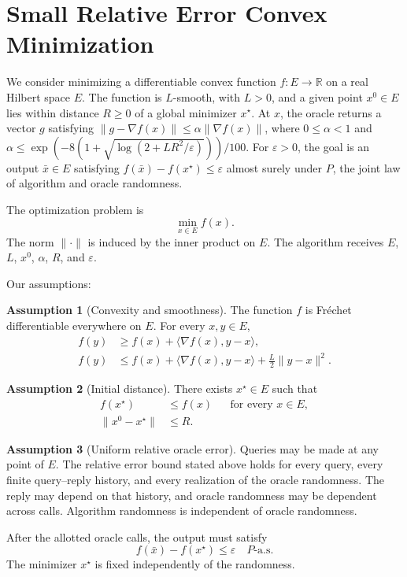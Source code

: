 \documentclass[10pt]{article}
\theoremstyle{definition}
\newtheorem{assumption}{Assumption}
\begin{document}
\section*{Small Relative Error Convex Minimization}
We consider minimizing a differentiable convex function $f:E\to\mathbb{R}$ on a real Hilbert space $E$. The function is $L$-smooth, with $L>0$, and a given point $x^0\in E$ lies within distance $R\geq0$ of a global minimizer $x^\star$. At $x$, the oracle returns a vector $g$ satisfying $\|g-\nabla f(x)\|\leq\alpha\|\nabla f(x)\|$, where $0\leq\alpha<1$ and $\alpha\leq\exp(-8(1+\sqrt{\log(2+LR^2/\varepsilon)}))/100$. For $\varepsilon>0$, the goal is an output $\bar{x}\in E$ satisfying $f(\bar{x})-f(x^\star)\leq\varepsilon$ almost surely under $P$, the joint law of algorithm and oracle randomness.

The optimization problem is
\[
\min_{x\in E} f(x).
\]
The norm $\|\cdot\|$ is induced by the inner product on $E$. The algorithm receives $E$, $L$, $x^0$, $\alpha$, $R$, and $\varepsilon$.

Our assumptions:
\begin{assumption}[Convexity and smoothness]
The function $f$ is Fr\'echet differentiable everywhere on $E$. For every $x,y\in E$,
\[
\begin{aligned}
f(y)&\geq f(x)+\langle\nabla f(x),y-x\rangle,\\
f(y)&\leq f(x)+\langle\nabla f(x),y-x\rangle
       +\frac{L}{2}\|y-x\|^2.
\end{aligned}
\]
\end{assumption}

\begin{assumption}[Initial distance]
There exists $x^\star\in E$ such that
\[
\begin{aligned}
f(x^\star)&\leq f(x) &&\text{for every }x\in E,\\
\|x^0-x^\star\|&\leq R.
\end{aligned}
\]
\end{assumption}

\begin{assumption}[Uniform relative oracle error]
Queries may be made at any point of $E$. The relative error bound stated above holds for every query, every finite query--reply history, and every realization of the oracle randomness. The reply may depend on that history, and oracle randomness may be dependent across calls. Algorithm randomness is independent of oracle randomness.
\end{assumption}

After the allotted oracle calls, the output must satisfy
\[
f(\bar{x})-f(x^\star)\leq\varepsilon
\quad P\text{-a.s.}
\]
The minimizer $x^\star$ is fixed independently of the randomness.
\end{document}
